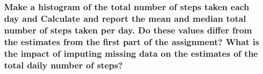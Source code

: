 \documentclass[]{article}
\newenvironment{Shaded}{\begin{snugshade}}{\end{snugshade}}
\newcommand{\KeywordTok}[1]{\textcolor[rgb]{0.13,0.29,0.53}{\textbf{#1}}}
\newcommand{\DecValTok}[1]{\textcolor[rgb]{0.00,0.00,0.81}{#1}}
\newcommand{\StringTok}[1]{\textcolor[rgb]{0.31,0.60,0.02}{#1}}
\newcommand{\ControlFlowTok}[1]{\textcolor[rgb]{0.13,0.29,0.53}{\textbf{#1}}}
\newcommand{\OperatorTok}[1]{\textcolor[rgb]{0.81,0.36,0.00}{\textbf{#1}}}
\newcommand{\NormalTok}[1]{#1}
\begin{document}
\begin{Shaded}
\end{Shaded}

\subsubsection{Make a histogram of the total number of steps taken each
day and Calculate and report the mean and median total number of steps
taken per day. Do these values differ from the estimates from the first
part of the assignment? What is the impact of imputing missing data on
the estimates of the total daily number of
steps?}\label{make-a-histogram-of-the-total-number-of-steps-taken-each-day-and-calculate-and-report-the-mean-and-median-total-number-of-steps-taken-per-day.-do-these-values-differ-from-the-estimates-from-the-first-part-of-the-assignment-what-is-the-impact-of-imputing-missing-data-on-the-estimates-of-the-total-daily-number-of-steps}
\end{document}

